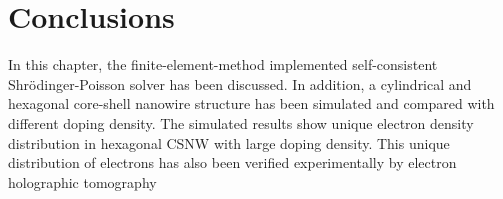 \section{Conclusions} \label{sec:conclusions}

In this chapter, the finite-element-method implemented self-consistent
Shr{\"o}dinger-Poisson solver has been discussed. In addition, a cylindrical
and hexagonal core-shell nanowire structure has been simulated and compared
with different doping density. The simulated results show unique electron
density distribution in hexagonal CSNW with large doping density. This unique
distribution of electrons has also been verified experimentally by electron
holographic tomography~\cite{Wolf:2011if} 
